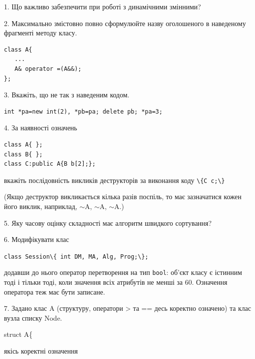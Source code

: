 \documentclass[12pt, ukrainian]{article}
\def\code#1{\Verb!#1!}
\begin{document}
{%
1. Що важливо забезпечити при роботі з динамічними змінними?%
\par
\vspace{2mm}
2. Максимально змістовно повно сформулюйте назву оголошеного в наведеному фрагменті методу класу.
\vspace{-3mm}
\begin{verbatim}class A{
   ...
   A& operator =(A&&);
};\end{verbatim}
\vspace{-3mm}
\par
\vspace{2mm}
3. Вкажіть, що не так з наведеним кодом.
\vspace{-3mm}
\begin{verbatim}int *pa=new int(2), *pb=pa; delete pb; *pa=3;\end{verbatim}
\vspace{-3mm}
\par
\vspace{2mm}
4. За наявності означень
\vspace{-3mm}
\begin{verbatim}
class A{ };
class B{ };
class C:public A{B b[2];};\end{verbatim}
\vspace{-3mm}
вкажіть послідовність викликів деструкторів за виконання коду \code{\{C c;\}} 

(Якщо деструктор викликається кілька разів поспіль, то має зазначатися кожен його виклик, наприклад, $\sim$A, $\sim$A, $\sim$A.)

\vspace{2mm}
5. Яку часову оцінку складності має алгоритм швидкого сортування?
\par
\vspace{2mm}
6. Модифікувати клас 

\qquad\code{class Session\{ int DM, MA, Alg, Prog;\};} 


додавши до нього оператор перетворення на тип \code{bool}: об'єкт класу є істинним тоді і тільки тоді, коли значення всіх атрибутів не менші за 60. Означення оператора теж має бути записане.%
\par
\vspace{2mm}
7. 
Задано клас A (структуру, оператори > та == десь коректно означено) та клас вузла списку Node.

struct A\{

\quad  якісь коректні означення 

}
\end{document}

